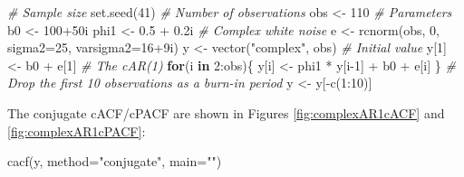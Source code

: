 \documentclass[
]{book}
\newenvironment{Shaded}{\begin{snugshade}}{\end{snugshade}}
\newcommand{\AttributeTok}[1]{\textcolor[rgb]{0.77,0.63,0.00}{#1}}
\newcommand{\CommentTok}[1]{\textcolor[rgb]{0.56,0.35,0.01}{\textit{#1}}}
\newcommand{\ControlFlowTok}[1]{\textcolor[rgb]{0.13,0.29,0.53}{\textbf{#1}}}
\newcommand{\DecValTok}[1]{\textcolor[rgb]{0.00,0.00,0.81}{#1}}
\newcommand{\FloatTok}[1]{\textcolor[rgb]{0.00,0.00,0.81}{#1}}
\newcommand{\FunctionTok}[1]{\textcolor[rgb]{0.00,0.00,0.00}{#1}}
\newcommand{\NormalTok}[1]{#1}
\newcommand{\OtherTok}[1]{\textcolor[rgb]{0.56,0.35,0.01}{#1}}
\newcommand{\SpecialCharTok}[1]{\textcolor[rgb]{0.00,0.00,0.00}{#1}}
\newcommand{\StringTok}[1]{\textcolor[rgb]{0.31,0.60,0.02}{#1}}
\begin{document}
\begin{Shaded}
\begin{Highlighting}[]
\CommentTok{\# Sample size}
\FunctionTok{set.seed}\NormalTok{(}\DecValTok{41}\NormalTok{)}
\CommentTok{\# Number of observations}
\NormalTok{obs }\OtherTok{\textless{}{-}} \DecValTok{110}
\CommentTok{\# Parameters}
\NormalTok{b0 }\OtherTok{\textless{}{-}} \DecValTok{100}\SpecialCharTok{+}\NormalTok{50i}
\NormalTok{phi1 }\OtherTok{\textless{}{-}} \FloatTok{0.5} \SpecialCharTok{+} \FloatTok{0.2}\NormalTok{i}
\CommentTok{\# Complex white noise}
\NormalTok{e }\OtherTok{\textless{}{-}} \FunctionTok{rcnorm}\NormalTok{(obs, }\DecValTok{0}\NormalTok{, }\AttributeTok{sigma2=}\DecValTok{25}\NormalTok{, }\AttributeTok{varsigma2=}\DecValTok{16}\SpecialCharTok{+}\NormalTok{9i)}
\NormalTok{y }\OtherTok{\textless{}{-}} \FunctionTok{vector}\NormalTok{(}\StringTok{"complex"}\NormalTok{, obs)}
\CommentTok{\# Initial value}
\NormalTok{y[}\DecValTok{1}\NormalTok{] }\OtherTok{\textless{}{-}}\NormalTok{ b0 }\SpecialCharTok{+}\NormalTok{ e[}\DecValTok{1}\NormalTok{]}
\CommentTok{\# The cAR(1)}
\ControlFlowTok{for}\NormalTok{(i }\ControlFlowTok{in} \DecValTok{2}\SpecialCharTok{:}\NormalTok{obs)\{}
\NormalTok{    y[i] }\OtherTok{\textless{}{-}}\NormalTok{ phi1 }\SpecialCharTok{*}\NormalTok{ y[i}\DecValTok{{-}1}\NormalTok{] }\SpecialCharTok{+}\NormalTok{ b0 }\SpecialCharTok{+}\NormalTok{ e[i]}
\NormalTok{\}}
\CommentTok{\# Drop the first 10 observations as a burn{-}in period}
\NormalTok{y }\OtherTok{\textless{}{-}}\NormalTok{ y[}\SpecialCharTok{{-}}\FunctionTok{c}\NormalTok{(}\DecValTok{1}\SpecialCharTok{:}\DecValTok{10}\NormalTok{)]}
\end{Highlighting}
\end{Shaded}

The conjugate cACF/cPACF are shown in Figures \ref{fig:complexAR1cACF} and \ref{fig:complexAR1cPACF}:

\begin{Shaded}
\begin{Highlighting}[]
\FunctionTok{cacf}\NormalTok{(y, }\AttributeTok{method=}\StringTok{"conjugate"}\NormalTok{, }\AttributeTok{main=}\StringTok{""}\NormalTok{)}
\end{Highlighting}
\end{Shaded}
\end{document}
